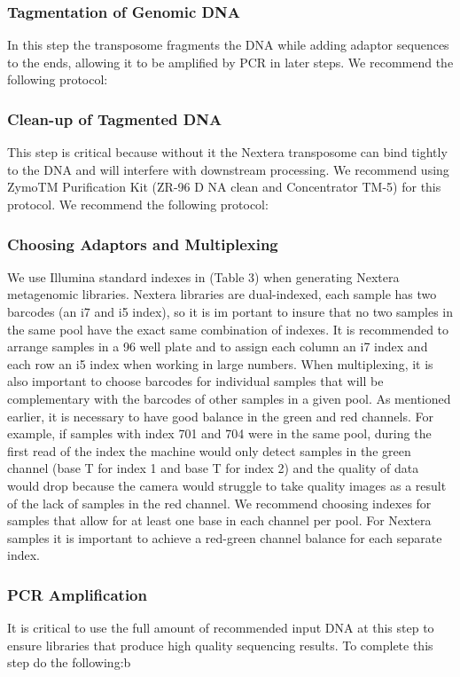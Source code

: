 \documentclass[graybox]{svmult}
\begin{document}
\subsubsection{Tagmentation of Genomic DNA}

In this step the transposome fragments the DNA while adding adaptor sequences to the ends, allowing it to be amplified by PCR in later steps.
We recommend the following protocol:


\subsubsection{Clean-up of Tagmented DNA}

This step is critical because without it the Nextera transposome can bind tightly to the DNA and will interfere with downstream processing.  We recommend using ZymoTM Purification Kit (ZR-96 D
NA clean and Concentrator TM-5) for this protocol. We recommend the following protocol:


\subsubsection{Choosing Adaptors and Multiplexing}

We use Illumina standard indexes in (Table 3) when generating Nextera metagenomic libraries. Nextera libraries are dual-indexed, each sample has two  barcodes (an i7 and i5 index), so it is im
portant to insure that no two samples in the same pool have the exact same combination of indexes. It is recommended to arrange samples in a 96 well plate and to assign each column an i7 index
 and each row an i5 index when working in large numbers. When multiplexing, it is also important to choose barcodes for individual samples that will be complementary with the barcodes of other
 samples in a given pool. As mentioned earlier, it is necessary to have good balance in the green and red channels. For example, if samples with index 701 and 704 were in the same pool, during
 the first read of the index the machine would only detect samples in the green channel (base T for index 1 and base T for index 2) and the quality of data would drop because the camera would 
struggle to take quality images as a result of the lack of samples in the red channel. We recommend choosing indexes for samples that allow for at least one base in each channel per pool. For 
Nextera samples it is important to achieve a red-green channel balance for each separate index.


\subsubsection{PCR Amplification}
It is critical to use the full amount of recommended input DNA at this step to ensure libraries that produce high quality sequencing results. To complete this step do the following:b\\
\end{document}
